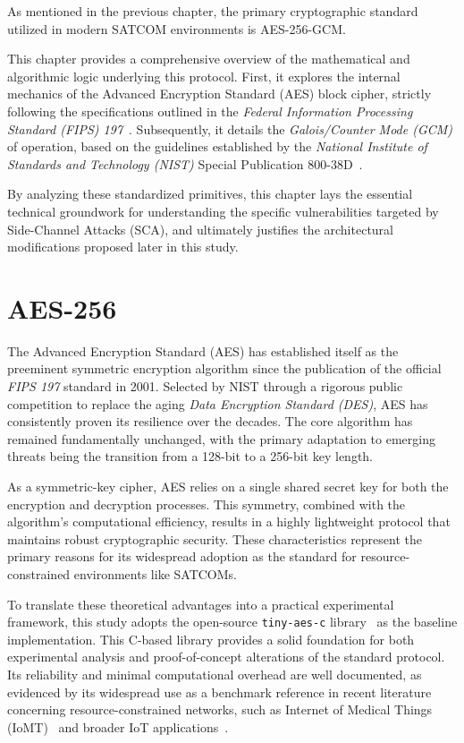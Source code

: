 \documentclass[11pt,a4paper]{report}
\begin{document}
As mentioned in the previous chapter, the primary cryptographic standard utilized in modern SATCOM environments is AES-256-GCM. 

This chapter provides a comprehensive overview of the mathematical and algorithmic logic underlying this protocol. 
First, it explores the internal mechanics of the Advanced Encryption Standard (AES) block cipher, strictly following the specifications outlined in the \textit{Federal Information Processing Standard (FIPS) 197}~\cite{AES}.
Subsequently, it details the \textit{Galois/Counter Mode (GCM)} of operation, based on the guidelines established by the \textit{National Institute of Standards and Technology (NIST)} Special Publication 800-38D~\cite{GCM}.

By analyzing these standardized primitives, this chapter lays the essential technical groundwork for understanding the specific vulnerabilities targeted by Side-Channel Attacks (SCA), 
and ultimately justifies the architectural modifications proposed later in this study.

\section{AES-256}
The Advanced Encryption Standard (AES) has established itself as the preeminent symmetric encryption algorithm since the publication of the official \textit{FIPS 197} standard in 2001. 
Selected by NIST through a rigorous public competition to replace the aging \textit{Data Encryption Standard (DES)}, 
AES has consistently proven its resilience over the decades. 
The core algorithm has remained fundamentally unchanged, with the primary adaptation to emerging threats being the transition from a 128-bit to a 256-bit key length.

As a symmetric-key cipher, AES relies on a single shared secret key for both the encryption and decryption processes. 
This symmetry, combined with the algorithm's computational efficiency, results in a highly lightweight protocol that maintains robust cryptographic security. 
These characteristics represent the primary reasons for its widespread adoption as the standard for resource-constrained environments like SATCOMs.

To translate these theoretical advantages into a practical experimental framework, this study adopts the open-source \texttt{tiny-aes-c} library~\cite{tinyAES} as the baseline implementation. 
This C-based library provides a solid foundation for both experimental analysis and proof-of-concept alterations of the standard protocol. 
Its reliability and minimal computational overhead are well documented, as evidenced by its widespread use as a benchmark reference in recent literature concerning resource-constrained networks, such as Internet of Medical Things (IoMT)~\cite{tinyAES_IoMT} and broader IoT applications~\cite{tinyAES_IoT}.
\end{document}
